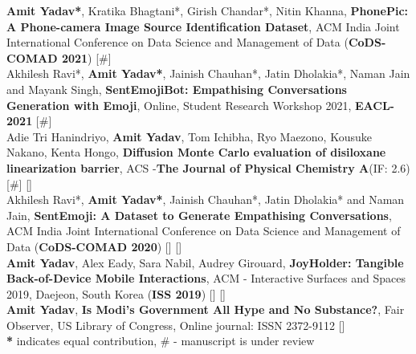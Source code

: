 


\begin{cvparagraph}
\textbf{Amit Yadav*}, Kratika Bhagtani*, Girish Chandar*, Nitin Khanna, \textbf{PhonePic: A Phone-camera Image Source Identification Dataset}, ACM India Joint International Conference on Data Science and Management of Data (\textbf{CoDS-COMAD 2021})
[\textbf{$\#$}] \vspace{0.3cm}\\
Akhilesh Ravi*, \textbf{Amit Yadav*}, Jainish Chauhan*, Jatin Dholakia*, Naman Jain and Mayank Singh, \textbf{SentEmojiBot: Empathising Conversations Generation with Emoji}, Online, Student Research Workshop 2021, \textbf{EACL-2021} [{$\#$}] \vspace{0.3cm}\\
Adie Tri Hanindriyo, \textbf{Amit Yadav}, Tom Ichibha, Ryo Maezono, Kousuke Nakano, Kenta Hongo, \textbf{Diffusion Monte Carlo evaluation of disiloxane linearization barrier}, ACS -\textbf{The Journal of Physical Chemistry A}{(IF: 2.6)} [{$\#$}] [] \vspace{0.3cm}\\
Akhilesh Ravi*, \textbf{Amit Yadav*}, Jainish Chauhan*, Jatin Dholakia* and Naman Jain, \textbf{SentEmoji: A Dataset to Generate Empathising Conversations}, ACM India Joint International Conference on Data Science and Management of Data (\textbf{CoDS-COMAD 2020}) [] [] \vspace{0.3cm}\\
\textbf{Amit Yadav}, Alex Eady, Sara Nabil, Audrey Girouard, \textbf{JoyHolder: Tangible Back-of-Device Mobile Interactions}, ACM - Interactive Surfaces and Spaces 2019, Daejeon, South Korea (\textbf{ISS 2019}) [] []
\vspace{0.3cm} \\
\textbf{Amit Yadav}, \textbf{Is Modi’s Government All Hype and No Substance?}, Fair Observer, US Library of Congress, Online journal: ISSN 2372-9112
[] \vspace{0.3cm} \\
\textbf{*} indicates equal contribution, \textbf{ $\#$} - manuscript is under review
\end{cvparagraph}
